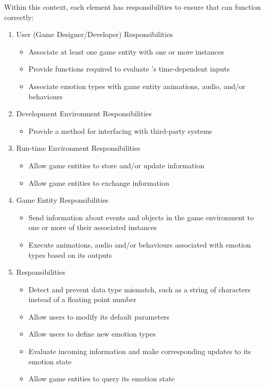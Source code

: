 Within this context, each element has responsibilities to ensure that
\progname{} can function correctly:
\begin{enumerate}

    \item User (Game Designer/Developer) Responsibilities
    \begin{itemize}
        \item Associate at least one game entity with one or more \progname{}
        instances
        \item Provide functions required to evaluate \progname{}'s
        time-dependent inputs
        \item Associate \progname{} emotion types with game entity animations,
        audio, and/or behaviours
    \end{itemize}

    \item Development Environment Responsibilities
    \begin{itemize}
        \item Provide a method for interfacing with third-party systems
    \end{itemize}

    \item Run-time Environment Responsibilities
    \begin{itemize}
        \item Allow game entities to store and/or update information
        \item Allow game entities to exchange information
    \end{itemize}

    \item Game Entity Responsibilities
    \begin{itemize}
        \item Send information about events and objects in the game environment
        to one or more of their associated \progname{} instances
        \item Execute animations, audio and/or behaviours associated with
        \progname{} emotion types based on its outputs
    \end{itemize}

    \item \progname{} Responsibilities
    \begin{itemize}
        \item Detect and prevent data type mismatch, such as a string of
        characters instead of a floating point number
        \item Allow users to modify its default parameters
        \item Allow users to define new emotion types
        \item Evaluate incoming information and make corresponding updates to
        its emotion state
        \item Allow game entities to query its emotion state
    \end{itemize}

\end{enumerate}